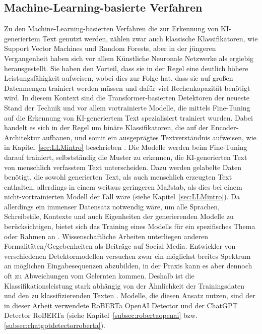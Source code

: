 \subsection{Machine-Learning-basierte Verfahren}
Zu den Machine-Learning-basierten Verfahren die zur Erkennung von KI-generiertem Text genutzt werden, zählen zwar auch klassische Klassifikatoren, wie Support Vector Machines und Random Forests, aber in der jüngeren Vergangenheit haben sich vor allem Künstliche Neuronale Netzwerke als ergiebig herausgestellt. Sie haben den Vorteil, dass sie in der Regel eine deutlich höhere Leistungsfähigkeit aufweisen, wobei dies zur Folge hat, dass sie auf großen Datenmengen trainiert werden müssen und dafür viel Rechenkapazität benötigt wird. In diesem Kontext sind die Transformer-basierten Detektoren der neueste Stand der Technik und vor allem vortrainierte Modelle, die mittels Fine-Tuning auf die Erkennung von KI-generiertem Text spezialisiert trainiert wurden. Dabei handelt es sich in der Regel um binäre Klassifikatoren, die auf der Encoder-Architektur aufbauen, und somit ein ausgeprägtes Textverständnis aufweisen, wie in Kapitel~\ref{sec:LLMintro} beschrieben \autocite{kehkashan2025}. Die Modelle werden beim Fine-Tuning darauf trainiert, selbstständig die Muster zu erkennen, die KI-generierten Text von menschlich verfasstem Text unterscheiden. Dazu werden gelabelte Daten benötigt, die sowohl generierten Text, als auch menschlich erzeugten Text enthalten, allerdings in einem weitaus geringeren Maßstab, als dies bei einem nicht-vortrainierten Modell der Fall wäre (siehe Kapitel~\ref{sec:LLMintro}). Da allerdings ein immenser Datensatz notwendig wäre, um alle Sprachen, Schreibstile, Kontexte und auch Eigenheiten der generierenden Modelle zu berücksichtigen, bietet sich das Training eines Modells für ein spezifisches Thema oder Rahmen an \autocite{Proehl_Mohrhardt_Foerster_Putzier_Zarnekow_2024}. Wissenschaftliche Arbeiten unterliegen anderen Formalitäten/Gegebenheiten als Beiträge auf Social Media. Entwickler von verschiedenen Detektormodellen versuchen zwar ein möglichst breites Spektrum an möglichen Eingabesequenzen abzubilden, in der Praxis kann es aber dennoch oft zu Abweichungen vom Gelernten kommen. Deshalb ist die Klassifikationsleistung stark abhängig von der Ähnlichkeit der Trainingsdaten und den zu klassifizierenden Texten \autocite{pudasaini2026aigeneratedtextdetectionfails}. Modelle, die diesen Ansatz nutzen, sind der in dieser Arbeit verwendete RoBERTa OpenAI Detector und der ChatGPT Detector RoBERTa (siehe Kapitel~\ref{subsec:robertaopenai} bzw. \ref{subsec:chatgptdetectorroberta}).

